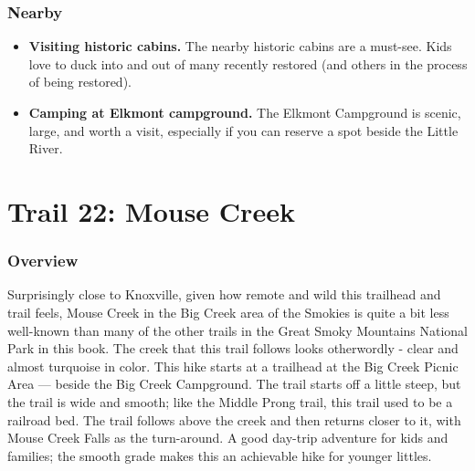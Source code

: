 \documentclass[
  letterpaper,
  DIV=11,
  numbers=noendperiod]{scrreprt}
\providecommand{\tightlist}{%
  \setlength{\itemsep}{0pt}\setlength{\parskip}{0pt}}\usepackage{longtable,booktabs,array}
\begin{document}
\subsection{Nearby}\label{nearby-20}

\begin{itemize}
\tightlist
\item
  \textbf{Visiting historic cabins.} The nearby historic cabins are a
  must-see. Kids love to duck into and out of many recently restored
  (and others in the process of being restored).
\item
  \textbf{Camping at Elkmont campground.} The Elkmont Campground is
  scenic, large, and worth a visit, especially if you can reserve a spot
  beside the Little River.
\end{itemize}

\chapter{Trail 22: Mouse Creek}\label{trail-22-mouse-creek}

\subsection{Overview}\label{overview-22}

Surprisingly close to Knoxville, given how remote and wild this
trailhead and trail feels, Mouse Creek in the Big Creek area of the
Smokies is quite a bit less well-known than many of the other trails in
the Great Smoky Mountains National Park in this book. The creek that
this trail follows looks otherwordly - clear and almost turquoise in
color. This hike starts at a trailhead at the Big Creek Picnic Area ---
beside the Big Creek Campground. The trail starts off a little steep,
but the trail is wide and smooth; like the Middle Prong trail, this
trail used to be a railroad bed. The trail follows above the creek and
then returns closer to it, with Mouse Creek Falls as the turn-around. A
good day-trip adventure for kids and families; the smooth grade makes
this an achievable hike for younger littles.
\end{document}
